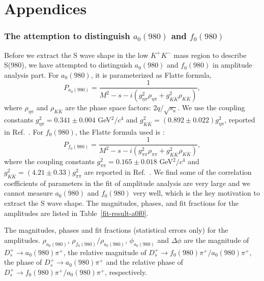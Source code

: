 \part*{Appendices}
\section{The attemption to distinguish $a_{0}(980)$ and $f_{0}(980)$}
\label{app:a0_f0_dis}
\par{
    Before we extract the S wave shape in the low $K^{+}K^{-}$ mass region to describe S(980), we have attempted to distinguish $a_{0}(980)$ and $f_{0}(980)$ in amplitude analysis part.
    For $a_{0}(980)$, it is parameterized as Flatte formula,
    \begin{equation}
        P_{a_{0}(980)}= \frac{1}{M^{2} - s - i(g_{\eta\pi}^{2}\rho_{\eta\pi} + g_{K\bar{K}}^{2}\rho_{K\bar{K}})}, \label{Flatte_a0}
    \end{equation}
    where $\rho_{\eta\pi}$ and $\rho_{K\bar{K}}$ are the phase space factors: $2q/\sqrt{s_{a}}$.
    We use the coupling constants $g_{\eta\pi}^{2} = 0.341 \pm 0.004$ GeV$^{2}/c^{4}$ and $g_{K\bar{K}}^{2} = (0.892 \pm 0.022)g_{\eta\pi}^{2}$, reported in Ref.~\cite{flatte_a0}. 
    For $f_{0}(980)$, the Flatte formula used is :
    \begin{equation}
        P_{f_{0}(980)}= \frac{1}{M^{2} - s - i(g_{\pi\pi}^{2}\rho_{\pi\pi} + g_{K\bar{K}}^{2}\rho_{K\bar{K}})}, \label{Flatte_f0}
    \end{equation}
    where the coupling constants $g_{\pi\pi}^{2} = 0.165 \pm 0.018$ GeV$^{2}/c^{4}$ and $g_{K\bar{K}}^{2} = (4.21 \pm 0.33)g_{\pi\pi}^{2}$ are reported in Ref.~\cite{flatte_f0}.
    We find some of the correlation coefficients of parameters in the fit of amplitude analysis are very large and we cannot measure $a_{0}(980)$ and $f_{0}(980)$ very well, which is the key motivation to extract the S wave shape.
    The magnitudes, phases, and fit fractions for the amplitudes are listed in Table~\ref{fit-result-a0f0}.
    \begin{table}[htbp]
        \caption{The magnitudes, phases and fit fractions (statistical errors only) for the amplitudes. 
        $\rho_{a_{0}(980)}$, $\rho_{f_{0}(980)}/\rho_{a_{0}(980)}$, $\phi_{a_{0}(980)}$ and $\Delta\phi$ are the magnitude of $D_{s}^{+} \rightarrow a_{0}(980)\pi^{+}$, the relative magnitude of $D_{s}^{+} \rightarrow f_{0}(980)\pi^{+}/a_{0}(980)\pi^{+}$, the phase of $D_{s}^{+} \rightarrow a_{0}(980)\pi^{+}$ and the relative phase of $D_{s}^{+} \rightarrow f_{0}(980)\pi^{+}/a_{0}(980)\pi^{+}$, respectively.}

\end{table}}
